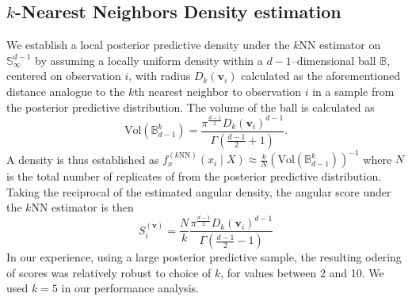 
\subsection{$k$-Nearest Neighbors Density estimation}
We establish a local posterior predictive density under the $k$NN estimator 
    \citep{mack1979} on $\mathbb{S}_{\infty}^{d-1}$ by assuming a locally 
    uniform density within a $d-1$--dimensional ball $\mathbb{B}$, centered on 
    observation $i$, with radius $D_{k}(\bm{v}_i)$ calculated as the 
    aforementioned distance analogue 
    to the $k$th nearest neighbor to observation $i$ in a sample from the 
    posterior predictive distribution. The volume of the ball is calculated as
    \begin{equation}
        \label{eq:vol_sphere}
        \text{Vol}(\mathbb{B}_{d-1}^k) =
        \frac{\pi^{\frac{d-1}{2}}D_{k}(\bm{v}_i)^{d-1}}{
            \Gamma\left(\frac{d-1}{2} + 1\right)}.
    \end{equation}
    A density is thus established as 
    $f_{x}^{(k\text{NN})}(x_i\mid X) \approx 
        \frac{k}{N}\left(\text{Vol}(\mathbb{B}_{d-1}^k)\right)^{-1}$
    where $N$ is the total number of replicates of from the posterior predictive
    distribution.  Taking the reciprocal of the estimated angular density, 
    the angular score under the $k$NN estimator is then
    \begin{equation}
        \label{eq:ad_knn_h}
        S_i^{(\bm{v})} = \frac{N}{k}
            \frac{\pi^{\frac{d-1}{2}}D_{k}(\bm{v}_i)^{d-1}}{
            \Gamma\left(\frac{d-1}{2} - 1\right)}
    \end{equation}
    In our experience, using a large posterior predictive sample, 
    the resulting odering of scores was relatively robust to choice of $k$, for
    values between 2 and 10.  We used $k = 5$ in our performance analysis.
